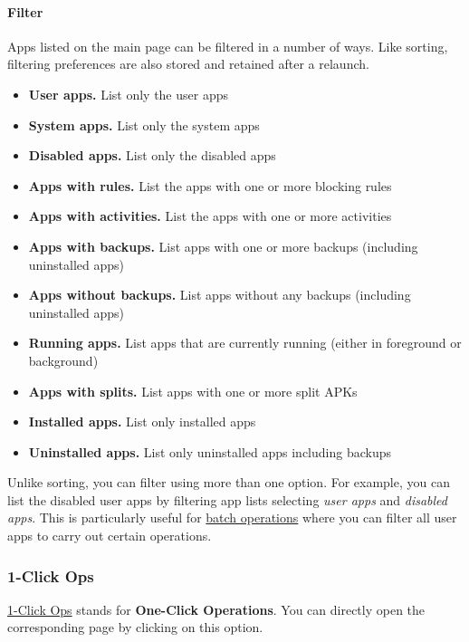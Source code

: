 \paragraph{Filter}\hypertarget{par:main-page-filter}{} %
Apps listed on the main page can be filtered in a number of ways. Like sorting, filtering preferences are also stored
and retained after a relaunch.
\begin{itemize}
    \item \textbf{User apps.} List only the user apps
    \item \textbf{System apps.} List only the system apps
    \item \textbf{Disabled apps.} List only the disabled apps
    \item \textbf{Apps with rules.} List the apps with one or more blocking rules
    \item \textbf{Apps with activities.} List the apps with one or more activities
    \item \textbf{Apps with backups.} List apps with one or more backups (including uninstalled apps)
    \item \textbf{Apps without backups.} List apps without any backups (including uninstalled apps)
    \item \textbf{Running apps.} List apps that are currently running (either in foreground or background)
    \item \textbf{Apps with splits.} List apps with one or more split APKs
    \item \textbf{Installed apps.} List only installed apps
    \item \textbf{Uninstalled apps.} List only uninstalled apps including backups
\end{itemize}

Unlike sorting, you can filter using more than one option. For example, you can list the disabled user apps by filtering
app lists selecting \textit{user apps} and \textit{disabled apps}. This is particularly useful for
\hyperref[subsec:batch-operations]{batch operations} where you can filter all user apps to carry out certain operations.

\subsubsection{1-Click Ops}\label{subsubsec:main:1-click-ops} %
\hyperref[sec:1-click-ops-page]{1-Click Ops} stands for \textbf{One-Click Operations}. You can directly open the
corresponding page by clicking on this option.

